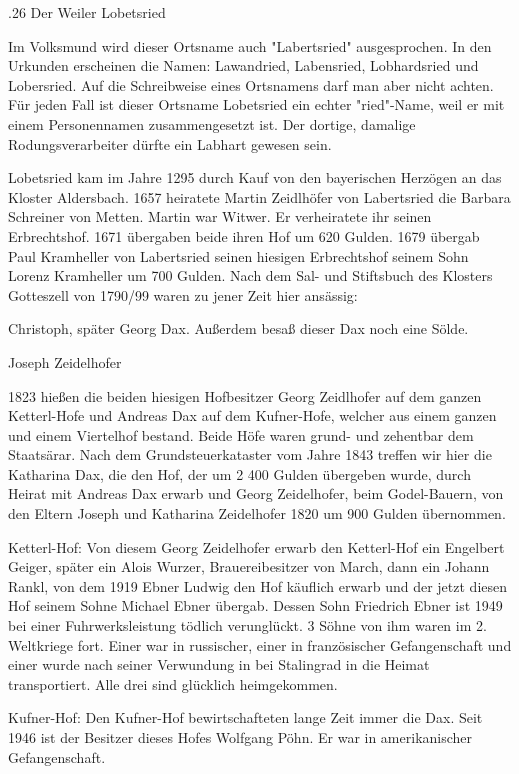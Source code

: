 .26 Der Weiler Lobetsried

Im Volksmund wird dieser Ortsname auch "Labertsried" ausgesprochen. In den
Urkunden erscheinen die Namen: Lawandried, Labensried, Lobhardsried und
Lobersried. Auf die Schreibweise eines Ortsnamens darf man aber nicht achten.
Für jeden Fall ist dieser Ortsname Lobetsried ein echter "ried"-Name, weil er
mit einem Personennamen zusammengesetzt ist. Der dortige, damalige
Rodungsverarbeiter dürfte ein Labhart gewesen sein.

Lobetsried kam im Jahre 1295 durch Kauf von den bayerischen Herzögen an das
Kloster Aldersbach. 1657 heiratete Martin Zeidlhöfer von Labertsried die Barbara
Schreiner von Metten. Martin war Witwer. Er verheiratete ihr seinen
Erbrechtshof. 1671 übergaben beide ihren Hof um 620 Gulden. 1679 übergab Paul
Kramheller von Labertsried seinen hiesigen Erbrechtshof seinem Sohn Lorenz
Kramheller um 700 Gulden. Nach dem Sal- und Stiftsbuch des Klosters Gotteszell
von 1790/99 waren zu jener Zeit hier ansässig:



Christoph, später Georg Dax. Außerdem besaß dieser Dax noch eine Sölde.

Joseph Zeidelhofer



1823 hießen die beiden hiesigen Hofbesitzer Georg Zeidlhofer auf dem ganzen
Ketterl-Hofe und Andreas Dax auf dem Kufner-Hofe, welcher aus einem ganzen und
einem Viertelhof bestand. Beide Höfe waren grund- und zehentbar dem Staatsärar.
Nach dem Grundsteuerkataster vom Jahre 1843 treffen wir hier die Katharina Dax,
die den Hof, der um 2 400 Gulden übergeben wurde, durch Heirat mit Andreas Dax
erwarb und Georg Zeidelhofer, beim Godel-Bauern, von den Eltern Joseph und
Katharina Zeidelhofer 1820 um 900 Gulden übernommen.

Ketterl-Hof: Von diesem Georg Zeidelhofer erwarb den Ketterl-Hof ein Engelbert
Geiger, später ein Alois Wurzer, Brauereibesitzer von March, dann ein Johann
Rankl, von dem 1919 Ebner Ludwig den Hof käuflich erwarb und der jetzt diesen
Hof seinem Sohne Michael Ebner übergab. Dessen Sohn Friedrich Ebner ist 1949 bei
einer Fuhrwerksleistung tödlich verunglückt. 3 Söhne von ihm waren im 2.
Weltkriege fort. Einer war in russischer, einer in französischer Gefangenschaft
und einer wurde nach seiner Verwundung in bei Stalingrad in die Heimat
transportiert. Alle drei sind glücklich heimgekommen.

Kufner-Hof: Den Kufner-Hof bewirtschafteten lange Zeit immer die Dax. Seit 1946
ist der Besitzer dieses Hofes Wolfgang Pöhn. Er war in amerikanischer
Gefangenschaft.

